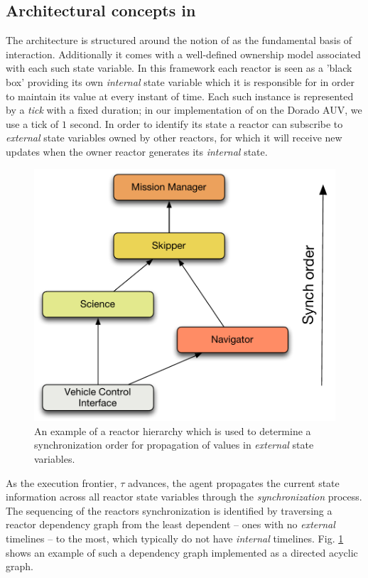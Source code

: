 \subsection{Architectural concepts in \rx}
\label{sec:arch:trex}

The \rx architecture is structured around the notion of  as the fundamental basis of interaction. Additionally it
comes with a well-defined ownership model associated with each such
state variable. In this framework each reactor is seen as a 'black
box' providing its own {\em internal} state variable which it is
responsible for in order to maintain its value at every instant of
time. Each such instance is represented by a {\em tick} with a fixed
duration; in our implementation of \rx on the Dorado AUV, we use a
tick of $1$ second. In order to identify its state a reactor can
subscribe to {\em external} state variables owned by other reactors,
for which it will receive new updates when the owner reactor generates
its {\em internal} state.

\begin{figure}[!htbp]
  \centering
  \includegraphics[scale=0.35]{figs/DAG-hierarchy}
  \caption{\small An example of a \rx reactor hierarchy which is used
    to determine a synchronization order for propagation of values in
    \emph{external} state variables.}
  \label{fig:reactor-DAG}
\end{figure}

As the execution frontier, $\tau$ advances, the \rx agent propagates
the current state information across all reactor state variables
through the {\em synchronization} process.  The sequencing of the
reactors synchronization is identified by traversing a reactor
dependency graph from the least dependent -- ones with no {\em
  external} timelines -- to the most, \ie which typically do not have
{\em internal} timelines. Fig. \ref{fig:reactor-DAG} shows an example
of such a dependency graph implemented as a directed acyclic graph.

